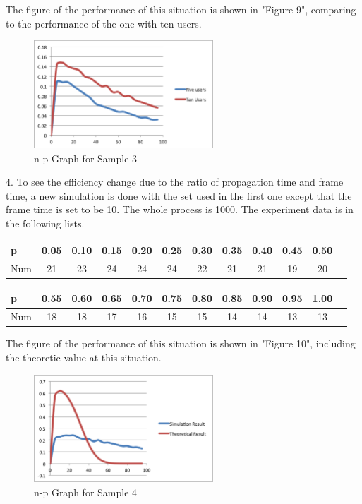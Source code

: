 \documentclass[11pt,a4paper]{report}
\begin{document}
The figure of the performance of this situation is shown in "Figure 9", comparing to the performance of the one with ten users.
\begin{figure}
\centering
\includegraphics[width=0.6\textwidth]{4_4.eps}
\caption{n-p Graph for Sample 3}
\end{figure}

4. To see the efficiency change due to the ratio of propagation time and frame time, a new simulation is done with the set used in the first one except that the frame time is set to be 10. The whole process is 1000. The experiment data is in the following lists.
\begin{table}[htbp]
\begin{tabular}{lccccccccccc}
\toprule
p & 0.05 & 0.10 & 0.15  & 0.20 & 0.25 & 0.30 & 0.35 & 0.40 & 0.45 & 0.50 \\
\midrule
Num & 21 & 23 & 24 & 24 & 24 & 22 & 21 & 21 & 19 & 20 \\
\bottomrule
\end{tabular}
\end{table}

\begin{table}[htbp]
\begin{tabular}{lccccccccccc}
\toprule
p & 0.55 & 0.60 & 0.65  & 0.70 & 0.75 & 0.80 & 0.85 & 0.90 & 0.95 & 1.00 \\
\midrule
Num & 18 & 18 & 17 & 16 & 15 & 15 & 14 & 14 & 13 & 13 \\
\bottomrule
\end{tabular}
\end{table}

The figure of the performance of this situation is shown in "Figure 10", including the theoretic value at this situation.
\begin{figure}
\centering
\includegraphics[width=0.6\textwidth]{4_5.eps}
\caption{n-p Graph for Sample 4}
\end{figure}
\end{document}
